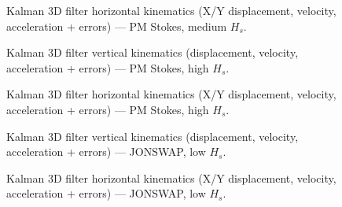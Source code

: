 \documentclass[11pt,letterpaper]{article}
\begin{document}
\begin{figure}[H]\centering
  \resizebox{\textwidth}{!}{}
  \caption{Kalman 3D filter horizontal kinematics (X/Y displacement, velocity, acceleration + errors) — PM Stokes, medium $H_s$.}
  \label{fig:w3d_pmstokes_medium_xykin}
\end{figure}


\begin{figure}[H]\centering
  \resizebox{\textwidth}{!}{}
  \caption{Kalman 3D filter vertical kinematics (displacement, velocity, acceleration + errors) — PM Stokes, high $H_s$.}
  \label{fig:w3d_pmstokes_high_zkin}
\end{figure}

\begin{figure}[H]\centering
  \resizebox{\textwidth}{!}{}
  \caption{Kalman 3D filter horizontal kinematics (X/Y displacement, velocity, acceleration + errors) — PM Stokes, high $H_s$.}
  \label{fig:w3d_pmstokes_high_xykin}
\end{figure}


\begin{figure}[H]\centering
  \resizebox{\textwidth}{!}{}
  \caption{Kalman 3D filter vertical kinematics (displacement, velocity, acceleration + errors) — JONSWAP, low $H_s$.}
  \label{fig:w3d_jonswap_low_zkin}
\end{figure}

\begin{figure}[H]\centering
  \resizebox{\textwidth}{!}{}
  \caption{Kalman 3D filter horizontal kinematics (X/Y displacement, velocity, acceleration + errors) — JONSWAP, low $H_s$.}
  \label{fig:w3d_jonswap_low_xykin}
\end{figure}
\end{document}
